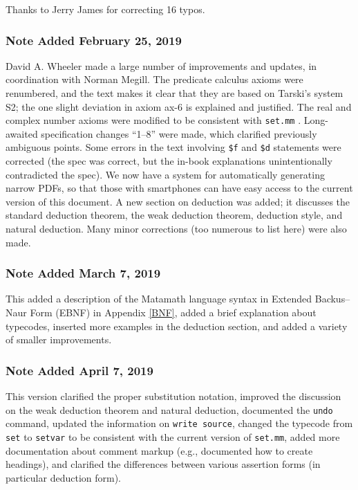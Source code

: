 Thanks to Jerry James for correcting 16 typos.

\subsubsection{Note Added February 25, 2019}\label{note201902}

David A. Wheeler
made a large number of improvements and updates,
in coordination with Norman Megill.
The predicate calculus axioms were renumbered, and the text makes
it clear that they are based on Tarski's system S2;
the one slight deviation in axiom ax-6 is explained and justified.
The real and complex number axioms were modified to be consistent with
\texttt{set.mm}%
.
Long-awaited specification changes ``1--8'' were made,
which clarified previously ambiguous points.
Some errors in the text involving \texttt{\$f} and
\texttt{\$d} statements were corrected (the spec was correct, but
the in-book explanations unintentionally contradicted the spec).
We now have a system for automatically generating narrow PDFs,
so that those with smartphones can have easy access to the current
version of this document.
A new section on deduction was added;
it discusses the standard deduction theorem,
the weak deduction theorem,
deduction style, and natural deduction.
Many minor corrections (too numerous to list here) were also made.

\subsubsection{Note Added March 7, 2019}\label{note201903}

This added a description of the Matamath language syntax in
Extended Backus--Naur Form (EBNF)
in Appendix \ref{BNF}, added a brief explanation about typecodes,
inserted more examples in the deduction section,
and added a variety of smaller improvements.

\subsubsection{Note Added April 7, 2019}\label{note201904}

This version clarified the proper substitution notation, improved the
discussion on the weak deduction theorem and natural deduction,
documented the \texttt{undo} command, updated the information on
\texttt{write source}, changed the typecode
from \texttt{set} to \texttt{setvar} to be consistent with the current
version of \texttt{set.mm}, added more documentation about comment markup
(e.g., documented how to create headings), and clarified the
differences between various assertion forms (in particular deduction form).

